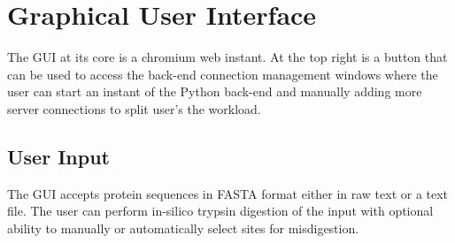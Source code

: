 \documentclass[10pt,a4paper]{memoir}
\begin{document}
\chapter{Graphical User Interface}
The GUI at its core is a chromium web instant. At the top right is a button that can be used to access the back-end connection management windows where the user can start an instant of the Python back-end and manually adding more server connections to split user's the workload.\par

\section{User Input}
The GUI accepts protein sequences in FASTA format either in raw text or a text file. The user can perform in-silico trypsin digestion of the input with optional ability to manually or automatically select sites for misdigestion.
\end{document}
